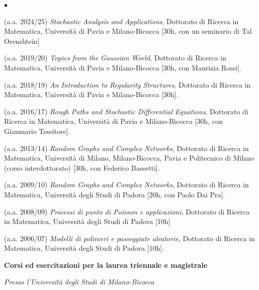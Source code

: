 \documentclass[a4paper,11pt,oneside]{amsart}
\newenvironment{myitemize}{%
\begin{list}{$\bullet$}%
 	{%
	\setlength{\itemsep}{0.3em}%
	\setlength{\topsep}{0.3em}%
	\setlength{\partopsep}{0em}%
	\setlength{\parsep}{0em}%
	\setlength{\parskip}{0em}%
	\setlength\leftmargin{1.5em}%
	\setlength\labelwidth{1.1em}%
	\setlength{\labelsep}{0.4em}%
	}%
	}%
{\end{list}}
\renewenvironment{itemize}{
\begin{myitemize}}%
{\end{myitemize}}
\begin{document}
\begin{itemize}
\item (a.a. 2024/25)
\textit{Stochastic Analysis and Applications},
Dottorato di Ricerca in Matematica, Università
di Pavia e Milano-Bicocca [30h, con un seminario di Tal Orenshtein]

\item (a.a. 2019/20)
\textit{Topics from the Gaussian World},
Dottorato di Ricerca in Matematica, Università
di Pavia e Milano-Bicocca [30h, con Maurizia Rossi].

\item (a.a. 2018/19)
\textit{An Introduction to Regularity Structures},
Dottorato di Ricerca in Matematica, Università
di Pavia e Milano-Bicocca [30h].

\item (a.a. 2016/17)
\textit{Rough Paths and Stochastic Differential Equations},
Dottorato di Ricerca in Matematica, Università
di Pavia e Milano-Bicocca
[30h, con Gianmario Tessitore].

\item (a.a. 2013/14)
\textit{Random Graphs and Complex Networks},
Dottorato di Ricerca in Matematica, Università
di Milano, Milano-Bicocca, Pavia e Politecnico di Milano (corso interdottorato)
[30h, con Federico Bassetti].

\item (a.a. 2009/10) \textit{Random Graphs and Complex Networks},
Dottorato di Ricerca in Matematica, Università degli Studi di Padova
[20h, con Paolo Dai Pra].

\item (a.a. 2008/09)
\textit{Processi di punto di Poisson e applicazioni},
Dottorato di Ricerca in Matematica, Università degli Studi di Padova [10h]

\item (a.a. 2006/07)
\textit{Modelli di polimeri e passeggiate aleatorie},
Dottorato di Ricerca in Matematica, Università degli Studi di Padova [10h].
\end{itemize}


\medskip
{\large\sf \bfseries Corsi ed esercitazioni per la laurea triennale e magistrale}

\medskip

\emph{Presso l'Università degli Studi di Milano-Bicocca}
\end{document}

